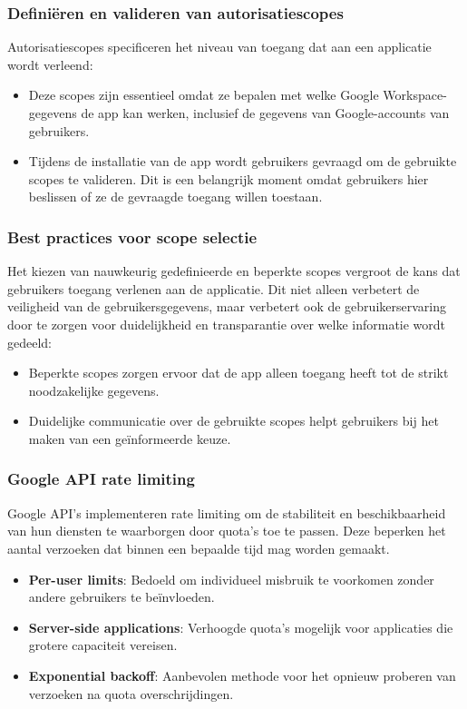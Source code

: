 \subsubsection{Definiëren en valideren van autorisatiescopes}
Autorisatiescopes specificeren het niveau van toegang dat aan een applicatie wordt verleend:
\begin{itemize}
    \item Deze scopes zijn essentieel omdat ze bepalen met welke Google Workspace-gegevens de app kan werken, inclusief de gegevens van Google-accounts van gebruikers.
    \item Tijdens de installatie van de app wordt gebruikers gevraagd om de gebruikte scopes te valideren. Dit is een belangrijk moment omdat gebruikers hier beslissen of ze de gevraagde toegang willen toestaan.
\end{itemize}

\subsubsection{Best practices voor scope selectie}
Het kiezen van nauwkeurig gedefinieerde en beperkte scopes vergroot de kans dat gebruikers toegang verlenen aan de applicatie. Dit niet alleen verbetert de veiligheid van de gebruikersgegevens, maar verbetert ook de gebruikerservaring door te zorgen voor duidelijkheid en transparantie over welke informatie wordt gedeeld:
\begin{itemize}
    \item Beperkte scopes zorgen ervoor dat de app alleen toegang heeft tot de strikt noodzakelijke gegevens.
    \item Duidelijke communicatie over de gebruikte scopes helpt gebruikers bij het maken van een geïnformeerde keuze.
\end{itemize}

\subsubsection{Google API rate limiting}
Google API's implementeren rate limiting om de stabiliteit en beschikbaarheid van hun diensten te waarborgen door quota's toe te passen. Deze beperken het aantal verzoeken dat binnen een bepaalde tijd mag worden gemaakt.
\begin{itemize}
    \item \textbf{Per-user limits}: Bedoeld om individueel misbruik te voorkomen zonder andere gebruikers te beïnvloeden.
    \item \textbf{Server-side applications}: Verhoogde quota's mogelijk voor applicaties die grotere capaciteit vereisen.
    \item \textbf{Exponential backoff}: Aanbevolen methode voor het opnieuw proberen van verzoeken na quota overschrijdingen.
\end{itemize}



